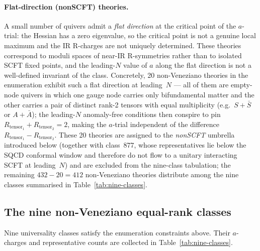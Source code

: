 \paragraph{Flat-direction (nonSCFT) theories.}
A small number of quivers admit a \emph{flat direction} at the
critical point of the $a$-trial: the Hessian has a zero eigenvalue,
so the critical point is not a genuine local maximum and the IR
R-charges are not uniquely determined.  These theories correspond to
moduli spaces of near-IR R-symmetries rather than to isolated SCFT
fixed points, and the leading-$N$ value of $a$ along the flat
direction is not a well-defined invariant of the class.  Concretely,
20 non-Veneziano theories in the enumeration exhibit such a flat
direction at leading~$N$ — all of them are empty-node quivers in
which one gauge node carries only bifundamental matter and the other
carries a pair of distinct rank-2 tensors with equal multiplicity
(e.g.\ $S+\bar S$ or $A+\bar A$); the leading-$N$ anomaly-free
conditions then conspire to pin $R_{\text{tensor}_1}+R_{\text{tensor}_2}=2$,
making the $a$-trial independent of the difference
$R_{\text{tensor}_1}-R_{\text{tensor}_2}$.  These 20 theories are
assigned to the \emph{nonSCFT} umbrella introduced below (together
with class~$877$, whose representatives lie below the SQCD conformal
window and therefore do not flow to a unitary interacting SCFT at
leading~$N$) and are excluded from the nine-class tabulation; the
remaining $432-20=412$ non-Veneziano theories distribute among the
nine classes summarised in Table~\ref{tab:nine-classes}.

\subsection{The nine non-Veneziano equal-rank classes}
\label{sec:class-nine}

Nine universality classes satisfy the enumeration constraints above.
Their $a$-charges and representative counts are collected in
Table~\ref{tab:nine-classes}.

